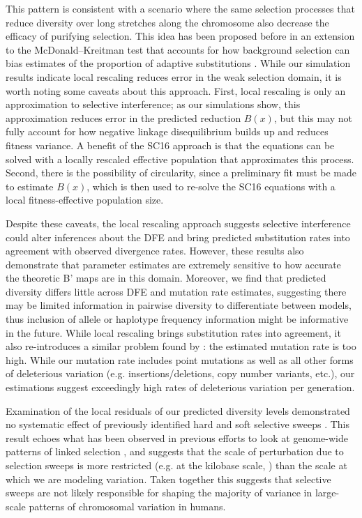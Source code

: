 \documentclass[11pt]{article}
\begin{document}
This pattern is consistent with a scenario where the same selection processes that reduce diversity over long stretches along the chromosome also decrease the efficacy of purifying selection. This idea has been proposed before in an extension to the McDonald--Kreitman test that accounts for how 
background selection can bias estimates of the proportion of adaptive substitutions 
\parencite{Uricchio2019-wp}. While our simulation results indicate local rescaling reduces error in the weak selection domain, it is worth noting some caveats about this approach. First, local rescaling is only an approximation to selective interference; as our simulations show, this approximation reduces error in the predicted reduction $B(x)$, but this may not fully account for how negative linkage disequilibrium builds up and reduces fitness variance. A benefit of the SC16 approach is that the equations 
can be solved with a locally rescaled effective population that approximates this process. Second, there is the possibility of circularity, since a preliminary fit must be made to estimate $B(x)$, which is then 
used to re-solve the SC16 equations with a local fitness-effective population size.

Despite these caveats, the local rescaling approach suggests selective interference could alter inferences about the DFE and bring predicted substitution rates into agreement with observed divergence rates.  However, these results also demonstrate that parameter estimates are extremely sensitive to how accurate the theoretic B' maps 
are in this domain. Moreover, we find that predicted diversity differs little across DFE and mutation rate estimates, suggesting there may be limited information in pairwise diversity to differentiate between models, thus inclusion 
of allele or haplotype frequency information might be informative in the future. While local rescaling brings substitution rates into agreement, it also re-introduces a similar problem found by \textcite{McVicker2009-ax}: the 
estimated mutation rate is too high. While our mutation rate includes point mutations as well as all other forms of 
deleterious variation (e.g. insertions/deletions, copy number variants, etc.), our estimations suggest exceedingly high 
rates of deleterious variation per generation.

Examination of the local residuals of our predicted diversity levels demonstrated no systematic effect of previously identified hard and soft selective sweeps \parencite{Schrider2017-yx}. 
This result echoes what has been observed in previous efforts to look at genome-wide patterns of 
linked selection \parencite{Hernandez2011-gs, Murphy2022-sj}, and suggests that the scale of perturbation due to selection sweeps is more restricted (e.g. at the kilobase scale, \cite{Akey2004-zg}) than the scale at which we are modeling variation. Taken together this suggests that selective sweeps are not likely responsible for shaping the 
majority of variance in large-scale patterns of chromosomal variation in humans. 
\end{document}
